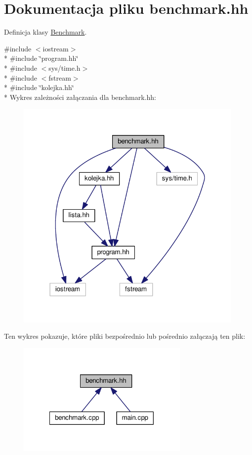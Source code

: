 \hypertarget{benchmark_8hh}{\section{Dokumentacja pliku benchmark.\-hh}
\label{benchmark_8hh}
}


Definicja klasy \hyperlink{class_benchmark}{Benchmark}.  


{\ttfamily \#include $<$iostream$>$}\\*
{\ttfamily \#include \char`\"{}program.\-hh\char`\"{}}\\*
{\ttfamily \#include $<$sys/time.\-h$>$}\\*
{\ttfamily \#include $<$fstream$>$}\\*
{\ttfamily \#include \char`\"{}kolejka.\-hh\char`\"{}}\\*
Wykres zależności załączania dla benchmark.\-hh\-:\nopagebreak
\begin{figure}[H]
\begin{center}
\leavevmode
\includegraphics[width=315pt]{benchmark_8hh__incl}
\end{center}
\end{figure}
Ten wykres pokazuje, które pliki bezpośrednio lub pośrednio załączają ten plik\-:\nopagebreak
\begin{figure}[H]
\begin{center}
\leavevmode
\includegraphics[width=237pt]{benchmark_8hh__dep__incl}
\end{center}
\end{figure}
